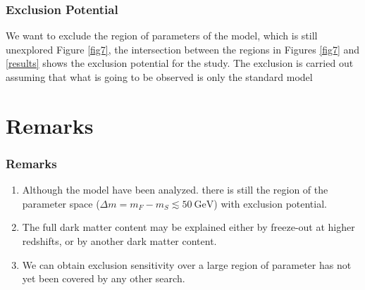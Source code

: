 \documentclass{beamer}
\begin{document}

\begin{frame}
\frametitle{Exclusion Potential}

We want to exclude the region of parameters of the model, which is still unexplored Figure \ref{fig7}, the intersection between the regions in Figures \ref{fig7} and \ref{results} shows the exclusion potential for the study.
The exclusion is carried out assuming that what is going to be observed is only the standard model

\end{frame}


\section{Remarks}
\begin{frame}
\frametitle{Remarks}

\begin{exampleblock}{}
	
	\begin{enumerate}

		\item Although the model have been analyzed. there is still the region of the parameter space ($\Delta m=m_{F}-m_S\lesssim 50\ \text{GeV}$) with exclusion potential.
		\item The full dark matter content may be explained either by freeze-out at higher redshifts, or by another dark matter content.
		\item  We can obtain exclusion sensitivity over a large region of parameter has not yet been covered by any other search.
	\end{enumerate}

\end{exampleblock}

\end{frame}



\end{document}
